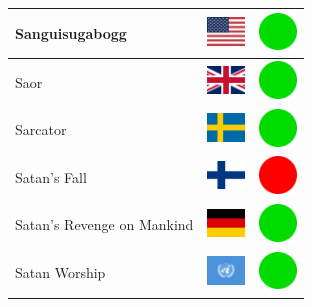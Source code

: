 \documentclass[12pt, a4paper, twoside]{report}
\begin{document}
\begin{center}
\begin{longtable}{|p{5cm}|p{2cm}|p{2cm}|}
 Sanguisugabogg                                             & \includegraphics[width=1cm]{../4x3/us} &   \includegraphics[width=1cm]{../likes/y} \\ \hline
 Saor                                                       & \includegraphics[width=1cm]{../4x3/gb} &   \includegraphics[width=1cm]{../likes/y} \\ \hline
 Sarcator                                                   & \includegraphics[width=1cm]{../4x3/se} &   \includegraphics[width=1cm]{../likes/y} \\ \hline
 Satan's Fall                                               & \includegraphics[width=1cm]{../4x3/fi} &   \includegraphics[width=1cm]{../likes/n} \\ \hline
 Satan's Revenge on Mankind                                 & \includegraphics[width=1cm]{../4x3/de} &   \includegraphics[width=1cm]{../likes/y} \\ \hline
 Satan Worship                                              & \includegraphics[width=1cm]{../4x3/un} &   \includegraphics[width=1cm]{../likes/y} \\ \hline

\end{longtable}
\end{center}
\end{document}
